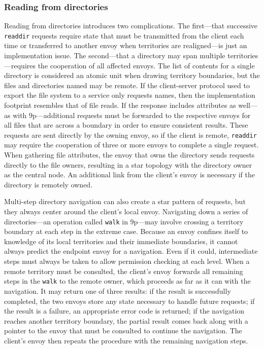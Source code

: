 \subsubsection{Reading from directories}\label{sec:walk-cache}

Reading from directories introduces two complications. The first---that successive \texttt{readdir} requests require state that must be transmitted from the client each time or transferred to another envoy when territories are realigned---is just an implementation issue. The second---that a directory may span multiple territories---requires the cooperation of all affected envoys. The list of contents for a single directory is considered an atomic unit when drawing territory boundaries, but the files and directories named may be remote. If the client-server protocol used to export the file system to a service only requests names, then the implementation footprint resembles that of file reads. If the response includes attributes as well---as with 9p---additional requests must be forwarded to the respective envoys for all files that are across a boundary in order to ensure consistent results. These requests are sent directly by the owning envoy, so if the client is remote, \texttt{readdir} may require the cooperation of three or more envoys to complete a single request. When gathering file attributes, the envoy that owns the directory sends requests directly to the file owners, resulting in a star topology with the directory owner as the central node. An additional link from the client's envoy is necessary if the directory is remotely owned.

Multi-step directory navigation can also create a star pattern of requests, but they always center around the client's local envoy. Navigating down a series of directories---an operation called \texttt{walk} in 9p---may involve crossing a territory boundary at each step in the extreme case. Because an envoy confines itself to knowledge of its local territories and their immediate boundaries, it cannot always predict the endpoint envoy for a navigation. Even if it could, intermediate steps must always be taken to allow permission checking at each level. When a remote territory must be consulted, the client's envoy forwards all remaining steps in the \texttt{walk} to the remote owner, which proceeds as far as it can with the navigation. It may return one of three results: if the result is successfully completed, the two envoys store any state necessary to handle future requests; if the result is a failure, an appropriate error code is returned; if the navigation reaches another territory boundary, the partial result comes back along with a pointer to the envoy that must be consulted to continue the navigation. The client's envoy then repeats the procedure with the remaining navigation steps.


